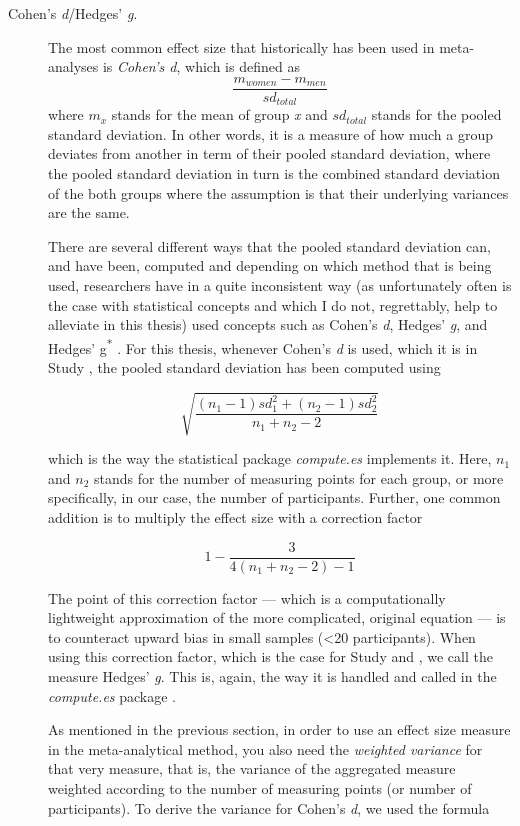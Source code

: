 \begin{description} \item [Cohen's \emph{d}/Hedges' \emph{g}.] The most common effect size that historically has been used in meta-analyses is \emph{Cohen's d}, which is defined as $$\frac{{m_{women}}-{m_{men}}}{sd_{total}}$$ where $m_x$ stands for the mean of group \emph{x} and ${sd}_{total}$ stands for the pooled standard deviation. In other words, it is a measure of how much a group deviates from another in term of their pooled standard deviation, where the pooled standard deviation in turn is the combined standard deviation of the both groups where the assumption is that their underlying variances are the same.

There are several different ways that the pooled standard deviation can, and have been, computed and depending on which method that is being used, researchers have in a quite inconsistent way (as unfortunately often is the case with statistical concepts and which I do not, regrettably, help to alleviate in this thesis) used concepts such as Cohen's \emph{d}, Hedges' \emph{g}, and Hedges' g\textsuperscript{*} \parencite{Grissom2005,Mcgrath2006,Durlak2009,Zakzanis2001}. For this thesis, whenever Cohen's \emph{d} is used, which it is in Study , the pooled standard deviation has been computed using

$$\sqrt{\frac{(n_1-1){sd}^2_1+(n_2-1){sd}^2_2}{n_1+n_2-2}}$$

which is the way the statistical package \emph{compute.es} \parencite{Del2013} implements it. Here, $n_1$ and $n_2$ stands for the number of measuring points for each group, or more specifically, in our case, the number of participants. Further, one common addition is to multiply the effect size with a correction factor

$$1-\frac{3}{4(n_{1}+n_{2}-2)-1}$$

The point of this correction factor --- which is a computationally lightweight approximation of the more complicated, original equation \parencite[p. 104]{Hedges1985} --- is to counteract upward bias in small samples (<20 participants). When using this correction factor, which is the case for Study  and , we call the measure Hedges' \emph{g}. This is, again, the way it is handled and called in the \emph{compute.es} package \parencite{Del2013}.

As mentioned in the previous section, in order to use an effect size measure in the meta-analytical method, you also need the \emph{weighted variance} for that very measure, that is, the variance of the aggregated measure weighted according to the number of measuring points (or number of participants). To derive the variance for Cohen's \emph{d}, we used the formula


\end{description}
